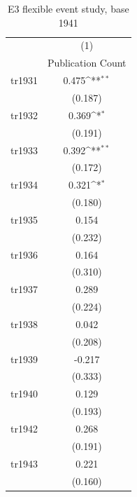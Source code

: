 \begin{table}[htbp]\centering
\def\sym#1{\ifmmode^{#1}\else\(^{#1}\)\fi}
\caption{E3 flexible event study, base 1941}
\begin{tabular}{l*{1}{c}}
\toprule
                    &\multicolumn{1}{c}{(1)}\\
                    &\multicolumn{1}{c}{Publication Count}\\
\midrule
tr1931              &       0.475\sym{**} \\
                    &     (0.187)         \\
\addlinespace
tr1932              &       0.369\sym{*}  \\
                    &     (0.191)         \\
\addlinespace
tr1933              &       0.392\sym{**} \\
                    &     (0.172)         \\
\addlinespace
tr1934              &       0.321\sym{*}  \\
                    &     (0.180)         \\
\addlinespace
tr1935              &       0.154         \\
                    &     (0.232)         \\
\addlinespace
tr1936              &       0.164         \\
                    &     (0.310)         \\
\addlinespace
tr1937              &       0.289         \\
                    &     (0.224)         \\
\addlinespace
tr1938              &       0.042         \\
                    &     (0.208)         \\
\addlinespace
tr1939              &      -0.217         \\
                    &     (0.333)         \\
\addlinespace
tr1940              &       0.129         \\
                    &     (0.193)         \\
\addlinespace
tr1942              &       0.268         \\
                    &     (0.191)         \\
\addlinespace
tr1943              &       0.221         \\
                    &     (0.160)         \\

\end{tabular}
\end{table}
